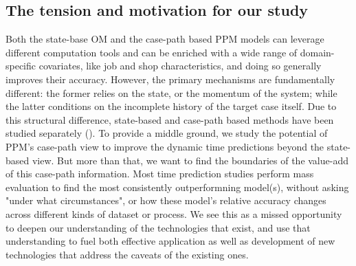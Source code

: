 \documentclass[
]{ceurart}
\begin{document}

\subsection{The tension and motivation for our study}
Both the state-base OM and the case-path based PPM models can leverage different computation tools and can be enriched with a wide range of domain-specific covariates, like job and shop characteristics, and doing so generally improves their accuracy. 
However, the primary mechanisms are fundamentally different: the former relies on the state, or the momentum of the system; while the latter conditions on the incomplete history of the target case itself. Due to this structural difference, 
state-based and case-path based methods have been studied separately (). To provide a middle ground, we study the potential of PPM's case-path view to improve the dynamic time predictions beyond the state-based view. But 
more than that, we want to find the boundaries of the value-add of this case-path information. Most time prediction studies perform mass evaluation to find the most consistently outperformning model(s), without asking "under what circumstances", 
or how these model's relative accuracy changes across different kinds of dataset or process. We see this as a missed opportunity to deepen our understanding of the technologies that exist, and use that understanding to fuel both effective
application as well as development of new technologies that address the caveats of the existing ones.
\end{document}
